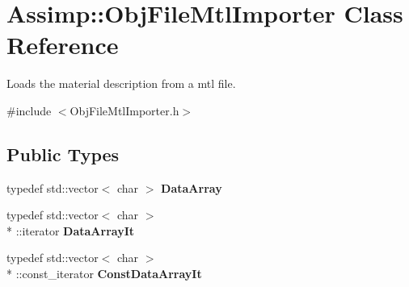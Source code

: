 \hypertarget{class_assimp_1_1_obj_file_mtl_importer}{\section{Assimp\+:\+:Obj\+File\+Mtl\+Importer Class Reference}
\label{class_assimp_1_1_obj_file_mtl_importer}
}


Loads the material description from a mtl file.  




{\ttfamily \#include $<$Obj\+File\+Mtl\+Importer.\+h$>$}

\subsection*{Public Types}
\begin{DoxyCompactItemize}
\item 
\hypertarget{class_assimp_1_1_obj_file_mtl_importer_a9142d3f502e10a019cbdbbcb0e91dc76}{typedef std\+::vector$<$ char $>$ {\bfseries Data\+Array}}\label{class_assimp_1_1_obj_file_mtl_importer_a9142d3f502e10a019cbdbbcb0e91dc76}

\item 
\hypertarget{class_assimp_1_1_obj_file_mtl_importer_ab92e35278d403d29895cd0797e9ea540}{typedef std\+::vector$<$ char $>$\\*
\+::iterator {\bfseries Data\+Array\+It}}\label{class_assimp_1_1_obj_file_mtl_importer_ab92e35278d403d29895cd0797e9ea540}

\item 
\hypertarget{class_assimp_1_1_obj_file_mtl_importer_a0f2a5d0b2d536e24ab4d36ec4d433954}{typedef std\+::vector$<$ char $>$\\*
\+::const\+\_\+iterator {\bfseries Const\+Data\+Array\+It}}\label{class_assimp_1_1_obj_file_mtl_importer_a0f2a5d0b2d536e24ab4d36ec4d433954}

\end{DoxyCompactItemize}
